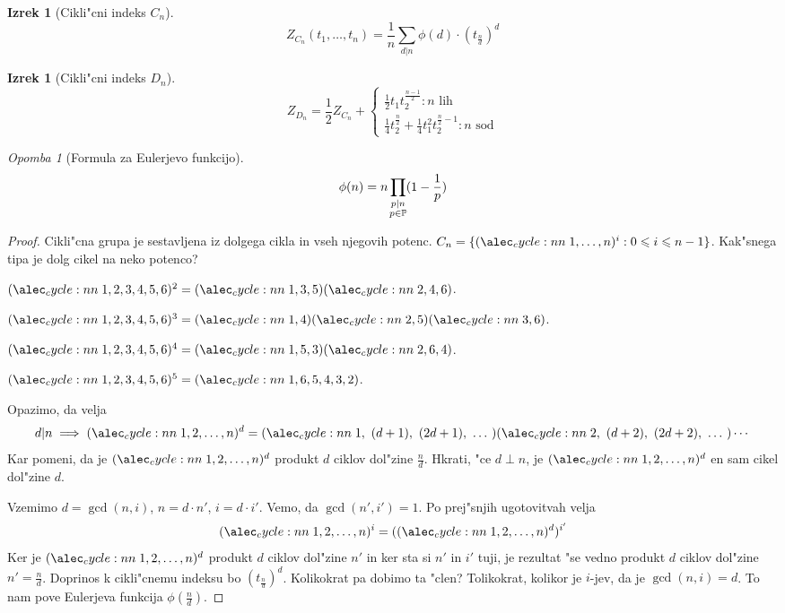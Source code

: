 \documentclass[a4paper,12pt]{article}
\theoremstyle{definition}
\newtheorem{theorem}[counter]{Izrek}
\theoremstyle{remark}
\newtheorem*{rem}{Opomba}
\begin{document}
\begin{theorem}[Cikli"cni indeks $C_n$]
	\[ Z_{C_n}(t_1, \ldots, t_n) = \frac{1}{n}\sum_{d | n} \phi(d) \cdot (t_{\frac{n}{d}})^d \]
\end{theorem}
\begin{theorem}[Cikli"cni indeks $D_n$]
	\[	Z_{D_n} = \frac{1}{2}Z_{C_n} +
	\begin{cases}
		\frac{1}{2} t_1 t_2^{\frac{n-1}{2}}: n \text{ lih}
		\\
		\frac{1}{4} t_2^{\frac{n}{2}} + \frac{1}{4} t_1^2 t_2^{\frac{n}{2}-1}: n \text{ sod}
	\end{cases}
	\]
\end{theorem}
\begin{rem}[Formula za Eulerjevo funkcijo]
	\[\phi(n) = n \prod_{\mathclap{\substack{p|n \\ p \in \mathbb{P}}}}(1-\frac{1}{p})\]
\end{rem}
\begin{proof}
	Cikli"cna grupa je sestavljena iz dolgega cikla in vseh njegovih potenc. $C_n = \{\cycle{1, \ldots, n}^i: 0 \leqslant i \leqslant n-1 \}$. Kak"snega tipa je dolg cikel na neko potenco?
	
	$\cycle{1, 2, 3, 4, 5, 6}^2 = \cycle{1, 3, 5}\cycle{2, 4, 6}$.
	
	$\cycle{1, 2, 3, 4, 5, 6}^3 = \cycle{1, 4}\cycle{2, 5}\cycle{3, 6}$.
	
	$\cycle{1, 2, 3, 4, 5, 6}^4 = \cycle{1, 5, 3}\cycle{2, 6, 4}$.

	$\cycle{1, 2, 3, 4, 5, 6}^5 = \cycle{1, 6, 5, 4, 3, 2}$.
	
	Opazimo, da velja
	\[d | n \implies \cycle{1, 2, \ldots, n}^d = \cycle{1,\ (d+1),\ (2d+1),\ \ldots \ }\cycle{2,\ (d+2),\ (2d+2),\ \ldots \ }\cdots\]
	Kar pomeni, da je $\cycle{1, 2, \ldots, n}^d$ produkt $d$ ciklov dol"zine $\frac{n}{d}$. Hkrati, "ce $d \perp n$, je $\cycle{1, 2, \ldots, n}^d$ en sam cikel dol"zine $d$.

	Vzemimo $d=\gcd(n, i)$, $n=d\cdot n'$, $i = d \cdot i'$. Vemo, da $\gcd(n', i')=1$. Po prej"snjih ugotovitvah velja
	\[\cycle{1, 2, \ldots, n}^i = (\cycle{1, 2, \ldots, n}^d)^{i'}\]
	Ker je $\cycle{1, 2, \ldots, n}^d$ produkt $d$ ciklov dol"zine $n'$ in ker sta si $n'$ in $i'$ tuji, je rezultat "se vedno produkt $d$ ciklov dol"zine $n'=\frac{n}{d}$. Doprinos k cikli"cnemu indeksu bo $(t_{\frac{n}{d}})^d$. Kolikokrat pa dobimo ta "clen? Tolikokrat, kolikor je $i$-jev, da je $\gcd(n, i)=d$. To nam pove Eulerjeva funkcija $\phi(\frac{n}{d})$.
\end{proof}
\end{document}
